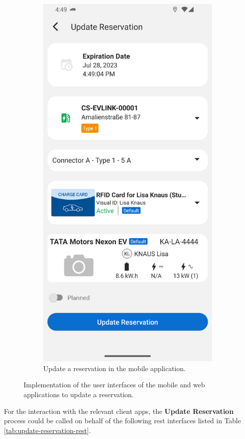 \begin{figure}[h]
\begin{subfigure}[c]{0.3\textwidth}
         \includegraphics[width=\textwidth,height=1.6\textwidth,keepaspectratio]{resources/images/main/6_implementation/screens/update_reservation/mobile/Update_Reservation.png}
         \caption{Update a reservation in the mobile application.}
         \label{fig:mobile-update-reservation-impl}
    \end{subfigure}
    \caption{Implementation of the user interfaces of the mobile and web applications to update a reservation.}
    \label{fig:impl-update-reservation}
\end{figure}

\noindent For the interaction with the relevant client apps, the \textbf{Update Reservation} process could be called on behalf of the following \acrshort{rest} interfaces listed in Table \ref{tab:update-reservation-rest}.

